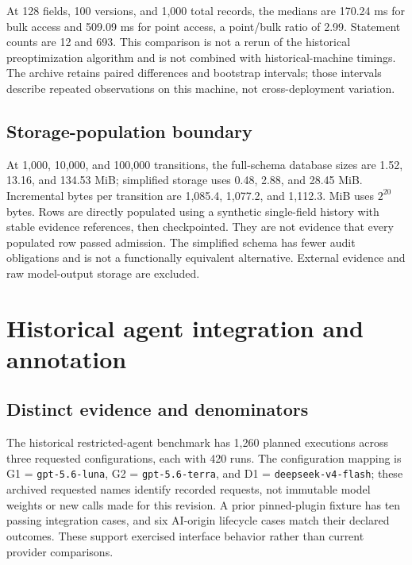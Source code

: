 \documentclass[11pt,a4paper]{article}
\newcommand{\code}[1]{\nolinkurl{#1}}
\begin{document}


At 128 fields, 100 versions, and 1,000 total records, the medians are 170.24 ms for bulk access and 509.09 ms for point access, a point/bulk ratio of 2.99. Statement counts are 12 and 693. This comparison is not a rerun of the historical preoptimization algorithm and is not combined with historical-machine timings. The archive retains paired differences and bootstrap intervals; those intervals describe repeated observations on this machine, not cross-deployment variation.

\subsection{Storage-population boundary}

At 1,000, 10,000, and 100,000 transitions, the full-schema database sizes are 1.52, 13.16, and 134.53 MiB; simplified storage uses 0.48, 2.88, and 28.45 MiB. Incremental bytes per transition are 1,085.4, 1,077.2, and 1,112.3. MiB uses $2^{20}$ bytes. Rows are directly populated using a synthetic single-field history with stable evidence references, then checkpointed. They are not evidence that every populated row passed admission. The simplified schema has fewer audit obligations and is not a functionally equivalent alternative. External evidence and raw model-output storage are excluded.

\section{Historical agent integration and annotation}
\label{app:historical-integration}

\subsection{Distinct evidence and denominators}

The historical restricted-agent benchmark has 1,260 planned executions across three requested configurations, each with 420 runs. The configuration mapping is G1 = \code{gpt-5.6-luna}, G2 = \code{gpt-5.6-terra}, and D1 = \code{deepseek-v4-flash}; these archived requested names identify recorded requests, not immutable model weights or new calls made for this revision. A prior pinned-plugin fixture has ten passing integration cases, and six AI-origin lifecycle cases match their declared outcomes. These support exercised interface behavior rather than current provider comparisons.
\end{document}
